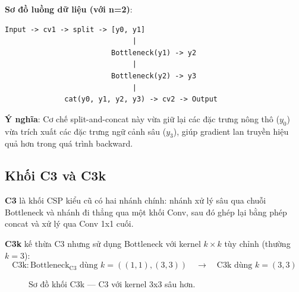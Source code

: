 \textbf{Sơ đồ luồng dữ liệu (với n=2)}:
\begin{verbatim}
Input -> cv1 -> split -> [y0, y1]
                              |
                         Bottleneck(y1) -> y2
                              |
                         Bottleneck(y2) -> y3
                              |
              cat(y0, y1, y2, y3) -> cv2 -> Output
\end{verbatim}

\textbf{Ý nghĩa}: Cơ chế split-and-concat này vừa giữ lại các đặc trưng nông thô ($y_0$) vừa trích xuất các đặc trưng ngữ cảnh sâu ($y_3$), giúp gradient lan truyền hiệu quả hơn trong quá trình backward.

\subsection{Khối C3 và C3k}
\label{subsec:c3_c3k}

\textbf{C3} là khối CSP kiểu cũ có hai nhánh chính: nhánh xử lý sâu qua chuỗi Bottleneck và nhánh đi thẳng qua một khối Conv, sau đó ghép lại bằng phép concat và xử lý qua Conv 1x1 cuối.

\textbf{C3k} kế thừa C3 nhưng sử dụng Bottleneck với kernel $k \times k$ tùy chỉnh (thường $k=3$):
\begin{equation}
    \text{C3k}: \text{Bottleneck}_{\text{C3}} \text{ dùng } k=((1,1),(3,3)) \quad \to \quad \text{C3k dùng } k=(3,3)
\end{equation}

\begin{figure}[H]
\centering
{}
\caption{Sơ đồ khối C3k --- C3 với kernel 3x3 sâu hơn.}
\label{fig:c3k}
\end{figure}

